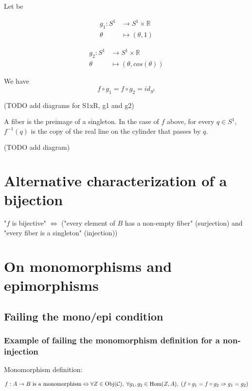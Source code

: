 \documentclass[12pt, letterpaper, twoside]{report}
\begin{document}
Let be 

$$
\begin{aligned}
g_1 : S^1    & \longrightarrow  S^1 \times \mathbb{R} \\
      \theta & \longmapsto      (\theta, 1)
\end{aligned}
$$


$$
\begin{aligned}
g_2 : S^1    & \longrightarrow  S^1 \times \mathbb{R} \\
      \theta & \longmapsto      (\theta, cos(\theta))
\end{aligned}
$$

We have
$$f \circ g_1 = f \circ g_2 = id_{S^1}$$

(TODO add diagrams for S1xR, g1 and g2)

A fiber is the preimage of a singleton. In the case of $f$ above, for every $q \in S^1$, $f^{-1}({q})$ is the copy of the real line on the cylinder that passes by $q$.

(TODO add diagram)






\section*{Alternative characterization of a bijection}
"$f$ is bijective" $\Leftrightarrow$ ("every element of $B$ has a non-empty fiber" (surjection) and "every fiber is a singleton" (injection))





\section*{On monomorphisms and epimorphisms}

\subsection*{Failing the mono/epi condition}


\subsubsection*{Example of failing the monomorphism definition for a non-injection}

Monomorphism definition:

$$
\text{$f : A \to B$ is a monomorphism}
\\ \Leftrightarrow \\
\forall Z \in \text{Obj}(\mathcal{C}), \;
\forall g_1, g_2 \in \text{Hom}(Z, A), \;
(f \circ g_1 = f \circ g_2 \Rightarrow g_1 = g_2)
$$
\end{document}
